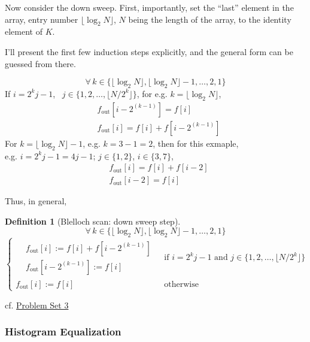 \documentclass[10pt]{amsart}
\newtheorem{definition}{Definition}
\begin{document}
\begin{multicols*}{2}
Now consider the down sweep.  First, importantly, set the ``last'' element in the array, entry number $\lfloor \log_2{N} \rfloor$, $N$ being the length of the array, to the identity element of $K$.  

I'll present the first few induction steps explicitly, and the general form can be guessed from there.


\[
\forall \, k \in \lbrace \lfloor \log_2N \rfloor , \lfloor \log_2N \rfloor -1, \dots , 2, 1 \rbrace
\]
If $i = 2^kj - 1$, \, $j\in \lbrace 1,2, \dots , \lfloor N/2^k \rfloor \rbrace$, for e.g. $k = \lfloor \log_2N \rfloor$,
\[
\begin{aligned}
  & f_{\text{out}}[i-2^{(k-1)}] = f[i] \\ 
  & f_{\text{out}}[i] = f[i] + f[i-2^{(k-1)} ]
  \end{aligned}
\]
For $k = \lfloor \log_2 N \rfloor -1$, e.g. $k=3-1=2$, then for this exmaple, \\
e.g. $i=2^kj-1 = 4j-1$; $j\in \lbrace 1,2 \rbrace$, $i\in \lbrace 3,7\rbrace$,
\[
\begin{aligned}
  & f_{\text{out}}[i] = f[i] + f[i-2] \\ 
  & f_{\text{out}}[i-2] = f[i]
\end{aligned}
\]

Thus, in general,
\begin{definition}[Blelloch scan: down sweep step]
\[
\forall \, k \in \lbrace \lfloor \log_2N \rfloor , \lfloor \log_2N \rfloor -1, \dots , 2, 1 \rbrace
\]
\begin{equation}
\begin{cases}
\begin{aligned} &   f_{\text{out}}[i] := f[i] + f[i-2^{(k-1)}] \\ 
  & f_{\text{out}}[i-2^{(k-1)}] := f[i] \end{aligned} & \text{ if } i = 2^kj-1 \text{ and } j \in \lbrace 1,2, \dots , \lfloor N/2^k \rfloor \rbrace \\
f_{\text{out}}[i] := f[i]  & \text{ otherwise}
  \end{cases}
\end{equation}
\end{definition}




cf.  \href{https://classroom.udacity.com/courses/cs344/lessons/86719951/concepts/907138050923#}{Problem Set 3} 

\subsubsection*{Histogram Equalization}


\end{multicols*}
\end{document}
